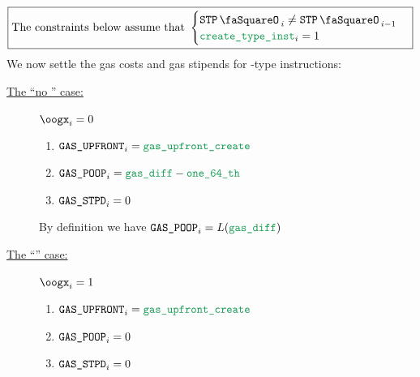 \[
	\boxed{\text{The constraints below assume that }
	\begin{cases}
		\stpStamp_{i} \neq \stpStamp_{i - 1} \\
		\isCreate_{i} =    1                 \\
	\end{cases}
	}
\]
We now settle the gas costs and gas stipends for -type instructions:
\begin{description}
	\item[\underline{The ``no \oogxSH{}'' case:}] \If $\oogx_{i} = 0$ \Then
		\begin{enumerate}
			\item $\gasUpfront_{i} = \locGasUpfrontCreate$
			\item $\gasPoop_{i} = \locDiff - \locOneSixtyFourth$
			\item $\texttt{GAS}\texttt{\_STPD}_{i} = 0$
		\end{enumerate}
		\saNote{} By definition we have $\gasPoop_{i} = L(\locDiff)$
	\item[\underline{The ``\oogxSH{}'' case:}] \If $\oogx_{i} = 1$ \Then
		\begin{enumerate}
			\item $\gasUpfront_{i} = \locGasUpfrontCreate$
			\item $\texttt{GAS}\texttt{\_POOP}_{i} = 0$
			\item $\texttt{GAS}\texttt{\_STPD}_{i} = 0$
		\end{enumerate}
\end{description}
